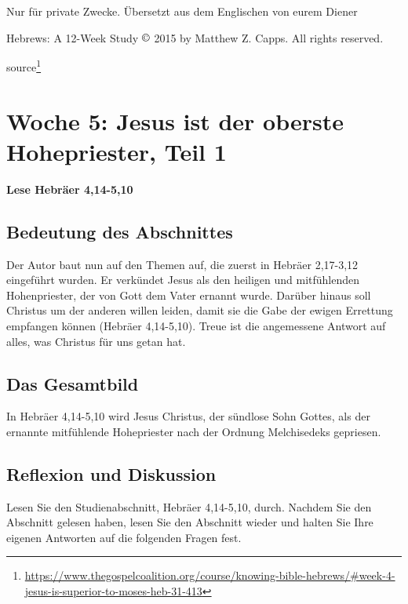 \documentclass[
  12pt,
]{krantz}
\makeatletter
\newenvironment{kframe}{%
\medskip{}
\setlength{\fboxsep}{.8em}
 \def\at@end@of@kframe{}%
 \ifinner\ifhmode%
  \def\at@end@of@kframe{\end{minipage}}%
  \begin{minipage}{\columnwidth}%
 \fi\fi%
 \def\FrameCommand##1{\hskip\@totalleftmargin \hskip-\fboxsep
 \colorbox{shadecolor}{##1}\hskip-\fboxsep
     \hskip-\linewidth \hskip-\@totalleftmargin \hskip\columnwidth}%
 \MakeFramed {\advance\hsize-\width
   \@totalleftmargin\z@ \linewidth\hsize
   \@setminipage}}%
 {\par\unskip\endMakeFramed%
 \at@end@of@kframe}
\newenvironment{rmdblock}[1]
  {
  \begin{itemize}
  \renewcommand{\labelitemi}{
    \raisebox{-.7\height}[0pt][0pt]{
      {\setkeys{Gin}{width=3em,keepaspectratio}\texttt{[image: img/\#1]}}
    }
  }
  \setlength{\fboxsep}{1em}
  \begin{kframe}
  \item
  }
  {
  \end{kframe}
  \end{itemize}
  }
\newenvironment{rmdbible}
  {\begin{rmdblock}{bible}}
  {\end{rmdblock}}
\renewcommand{\href}[2]{#2\footnote{\url{#1}}}
\makeatother
\begin{document}
Nur für private Zwecke. Übersetzt aus dem Englischen von eurem Diener

Hebrews: A 12-Week Study \(\copyright\) 2015 by Matthew Z. Capps. All rights reserved.

\href{https://www.thegospelcoalition.org/course/knowing-bible-hebrews/\#week-4-jesus-is-superior-to-moses-heb-31-413}{source}

\hypertarget{woche05}{%
\chapter{Woche 5: Jesus ist der oberste Hohepriester, Teil 1}\label{woche05}}

\begin{rmdbible}
\textbf{Lese Hebräer 4,14-5,10}
\end{rmdbible}

\hypertarget{bedeutung-des-abschnittes}{%
\section{Bedeutung des Abschnittes}\label{bedeutung-des-abschnittes}}

Der Autor baut nun auf den Themen auf, die zuerst in Hebräer 2,17-3,12 eingeführt wurden. Er verkündet Jesus als den heiligen und mitfühlenden Hohenpriester, der von Gott dem Vater ernannt wurde. Darüber hinaus soll Christus um der anderen willen leiden, damit sie die Gabe der ewigen Errettung empfangen können (Hebräer 4,14-5,10). Treue ist die angemessene Antwort auf alles, was Christus für uns getan hat.

\hypertarget{das-gesamtbild}{%
\section{Das Gesamtbild}\label{das-gesamtbild}}

In Hebräer 4,14-5,10 wird Jesus Christus, der sündlose Sohn Gottes, als der ernannte mitfühlende Hohepriester nach der Ordnung Melchisedeks gepriesen.

\hypertarget{reflexion-und-diskussion}{%
\section{Reflexion und Diskussion}\label{reflexion-und-diskussion}}

Lesen Sie den Studienabschnitt, Hebräer 4,14-5,10, durch. Nachdem Sie den Abschnitt gelesen haben, lesen Sie den Abschnitt wieder und halten Sie Ihre eigenen Antworten auf die folgenden Fragen fest.
\end{document}
